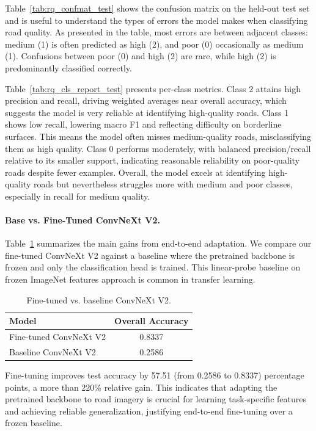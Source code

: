 Table~\ref{tab:rq_confmat_test} shows the confusion matrix on the held-out test set and is useful to understand the types of errors the model makes when classifying road quality. As presented in the table, most errors are between adjacent classes: medium (1) is often predicted as high (2), and poor (0) occasionally as medium (1). Confusions between poor (0) and high (2) are rare, while high (2) is predominantly classified correctly.

Table~\ref{tab:rq_cls_report_test} presents per-class metrics. Class 2 attains high precision and recall, driving weighted averages near overall accuracy, which suggests the model is very reliable at identifying high-quality roads. Class 1 shows low recall, lowering macro F1 and reflecting difficulty on borderline surfaces. This means the model often misses medium-quality roads, misclassifying them as high quality. Class 0 performs moderately, with balanced precision/recall relative to its smaller support, indicating reasonable reliability on poor-quality roads despite fewer examples. Overall, the model excels at identifying high-quality roads but nevertheless struggles more with medium and poor classes, especially in recall for medium quality.









\paragraph{Base vs. Fine-Tuned ConvNeXt V2.} Table~\ref{tab:rq_perf} summarizes the main gains from end-to-end adaptation. We compare our fine-tuned ConvNeXt V2 against a baseline where the pretrained backbone is frozen and only the classification head is trained. This linear-probe baseline on frozen ImageNet features approach is common in transfer learning.

\begin{table}[h!]
\centering

\caption{Fine-tuned vs. baseline ConvNeXt V2.}
\label{tab:rq_perf}
\begin{tabular}{lc}
    \toprule
    Model & Overall Accuracy \\
    \midrule
    Fine-tuned ConvNeXt V2 & 0.8337 \\
    Baseline ConvNeXt V2   & 0.2586 \\
    \bottomrule
\end{tabular}
\end{table}

Fine-tuning improves test accuracy by 57.51 (from 0.2586 to 0.8337) percentage points, a more than 220\% relative gain. This indicates that adapting the pretrained backbone to road imagery is crucial for learning task-specific features and achieving reliable generalization, justifying end-to-end fine-tuning over a frozen baseline.



